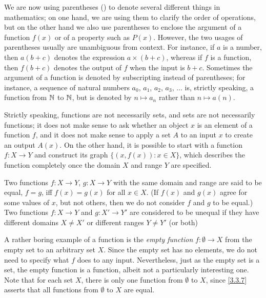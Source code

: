 \setcounter{thm}{4}
\begin{rmk}\label{3.3.5}
  We are now using parentheses () to denote several different things in mathematics;
  on one hand, we are using them to clarify the order of operations, but on the other hand we also use parentheses to enclose the argument of a function \(f(x)\) or of a property such as \(P(x)\).
  However, the two usages of parentheses usually are unambiguous from context.
  For instance, if \(a\) is a number, then \(a(b + c)\) denotes the expression \(a \times (b + c)\), whereas if \(f\) is a function, then \(f(b + c)\) denotes the output of \(f\) when the input is \(b + c\).
  Sometimes the argument of a function is denoted by subscripting instead of parentheses;
  for instance, a sequence of natural numbers \(a_0\), \(a_1\), \(a_2\), \(a_3\), \(\dots\) is, strictly speaking, a function from \(\mathbb{N}\) to \(\mathbb{N}\), but is denoted by \(n \mapsto a_n\) rather than \(n \mapsto a(n)\).
\end{rmk}

\begin{rmk}\label{3.3.6}
  Strictly speaking, functions are not necessarily sets, and sets are not necessarily functions;
  it does not make sense to ask whether an object \(x\) is an element of a function \(f\), and it does not make sense to apply a set \(A\) to an input \(x\) to create an output \(A(x)\).
  On the other hand, it is possible to start with a function \(f : X \to Y\) and construct its graph \(\{(x, f(x)) : x \in X\}\), which describes the function completely once the domain \(X\) and range \(Y\) are specified.
\end{rmk}

\begin{defn}\label{3.3.7}
  Two functions \(f : X \to Y\), \(g : X \to Y\) with the same domain and range are said to be equal, \(f = g\), iff \(f(x) = g(x)\) for all \(x \in X\).
  (If \(f(x)\) and \(g(x)\) agree for some values of \(x\), but not others, then we do not consider \(f\) and \(g\) to be equal.)
  Two functions \(f : X \to Y\) and \(g : X' \to Y'\) are considered to be unequal if they have different domains \(X \neq X'\) or different ranges \(Y \neq Y'\) (or both)
\end{defn}

\begin{note}
  A rather boring example of a function is the \emph{empty function} \(f : \emptyset \to X\) from the empty set to an arbitrary set \(X\).
  Since the empty set has no elements, we do not need to specify what \(f\) does to any input.
  Nevertheless, just as the empty set is a set, the empty function is a function, albeit not a particularly interesting one.
  Note that for each set \(X\), there is only one function from \(\emptyset\) to \(X\), since \cref{3.3.7} asserts that all functions from \(\emptyset\) to \(X\) are equal.
\end{note}

